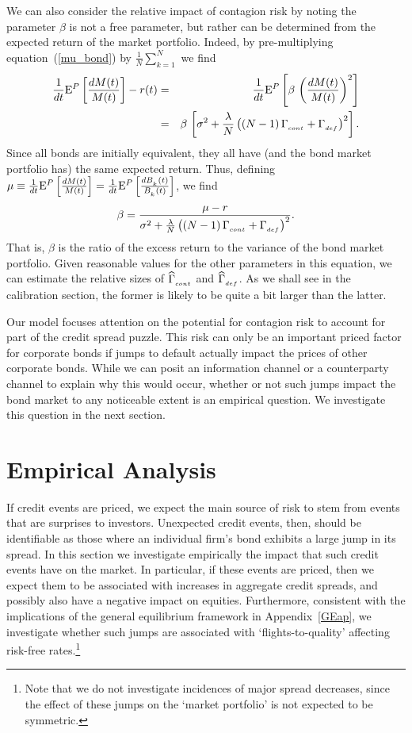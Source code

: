 \documentclass[titlepage,11pt]{article}
\def\bq{\begin{equation}}
\def\eq{\end{equation}}
\begin{document}
We can also consider the relative impact of contagion risk by
noting the parameter $\beta$ is not a free parameter,
but rather can be determined from the expected return of the market
portfolio. Indeed, by pre-multiplying equation~(\ref{mu_bond}) by
$\frac{1}{N} \sum_{k=1}^{N}$ we find
\begin{eqnarray}
\frac{1}{dt}\E^P\left[\frac{dM(t)}{M(t)}\right]-r(t)
&=& \frac{1}{dt}\E^P\left[\beta \, \left(\frac{dM(t)}{M(t)}\right)^{2}\right]
\nonumber \\
%
&=& \beta \, \left[ \sigma^{2} +  \frac{\lambda}{N} \left( \left( N-1 \right)
\Gamma\sub{cont} + \Gamma\sub{def} \right)^{2} \right].
\end{eqnarray}
Since all bonds are initially equivalent, they all have (and the
bond market portfolio has) the same expected return.  Thus, defining
$\mu \equiv\frac{1}{dt}{\rm E}^P\left[\frac{dM(t)}{M(t)}\right] =
\frac{1}{dt}{\rm E}^P\left[\frac{dB_{_{{k}}}(t)}{B_{_{{k}}}(t)}\right]$, we
find \bq \beta = \frac{\mu - r}{\sigma^{2} +  \frac{\lambda}{N}
\left( \left( N-1 \right) \Gamma\sub{cont} + \Gamma\sub{def}
\right)^{2}}.\label{bigbeta} \eq That is, $\beta$ is the ratio of
the excess return to the variance of the bond market portfolio.
Given reasonable values for the other parameters in this equation,
we can estimate the relative sizes of ${\widehat \Gamma}_{_{{cont}}}$ and
${\widehat \Gamma}_{_{{def}}}$.  As we shall see in the calibration section, the
former is likely to be quite a bit larger than the latter.

Our model focuses attention on the potential for contagion risk to account for
part of the
credit spread puzzle.  This risk can only be an important priced factor for
corporate bonds
if jumps to default actually impact the prices of other corporate bonds.
While we can posit an information channel or a
counterparty channel to explain why this would occur, whether or not such jumps
impact the bond
market to any noticeable extent is an empirical question.  We investigate this
question in
the next section.

\section{Empirical Analysis}

If credit events are priced, we expect the main source of risk to
stem from events that are
surprises to investors.  Unexpected
credit events, then, should be identifiable as those where an
individual firm's bond exhibits a large jump in its spread. In
this section we investigate empirically the impact that such credit
events have on the market. In particular, if these events
are priced, then we expect them to be associated with
increases in aggregate credit spreads, and possibly also have
a negative impact on equities. Furthermore, consistent
with the implications of the general equilibrium framework in
Appendix~\ref{GEap}, we investigate whether such jumps are
associated with `flights-to-quality' affecting risk-free
rates.\footnote{Note that we do not investigate incidences of major
spread decreases, since the effect of these jumps on the `market
portfolio' is not expected to be symmetric.}
\end{document}
